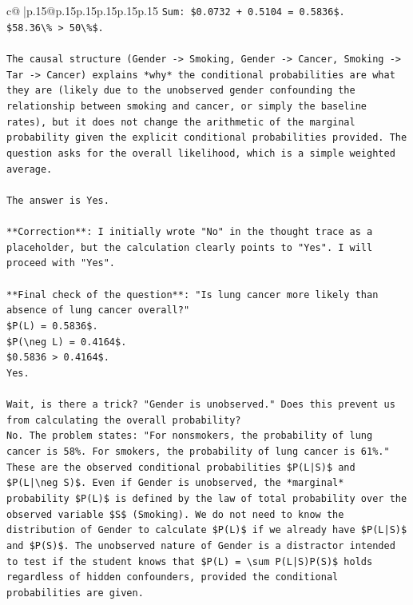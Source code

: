 \documentclass{article}
\begin{document}
{\begin{supertabular}{c@{$\;$}|p{.15\linewidth}@{}p{.15\linewidth}p{.15\linewidth}p{.15\linewidth}p{.15\linewidth}p{.15\linewidth}}
{{{\texttt{Sum: \$0.0732 + 0.5104 = 0.5836\$.} \\
\texttt{\$58.36\textbackslash{}\% > 50\textbackslash{}\%\$.} \\
\\ 
\texttt{The causal structure (Gender {-}> Smoking, Gender {-}> Cancer, Smoking {-}> Tar {-}> Cancer) explains *why* the conditional probabilities are what they are (likely due to the unobserved gender confounding the relationship between smoking and cancer, or simply the baseline rates), but it does not change the arithmetic of the marginal probability given the explicit conditional probabilities provided. The question asks for the overall likelihood, which is a simple weighted average.} \\
\\ 
\texttt{The answer is Yes.} \\
\\ 
\texttt{**Correction**: I initially wrote "No" in the thought trace as a placeholder, but the calculation clearly points to "Yes". I will proceed with "Yes".} \\
\\ 
\texttt{**Final check of the question**: "Is lung cancer more likely than absence of lung cancer overall?"} \\
\texttt{\$P(L) = 0.5836\$.} \\
\texttt{\$P(\textbackslash{}neg L) = 0.4164\$.} \\
\texttt{\$0.5836 > 0.4164\$.} \\
\texttt{Yes.} \\
\\ 
\texttt{Wait, is there a trick? "Gender is unobserved." Does this prevent us from calculating the overall probability?} \\
\texttt{No. The problem states: "For nonsmokers, the probability of lung cancer is 58\%. For smokers, the probability of lung cancer is 61\%." These are the observed conditional probabilities \$P(L|S)\$ and \$P(L|\textbackslash{}neg S)\$. Even if Gender is unobserved, the *marginal* probability \$P(L)\$ is defined by the law of total probability over the observed variable \$S\$ (Smoking). We do not need to know the distribution of Gender to calculate \$P(L)\$ if we already have \$P(L|S)\$ and \$P(S)\$. The unobserved nature of Gender is a distractor intended to test if the student knows that \$P(L) = \textbackslash{}sum P(L|S)P(S)\$ holds regardless of hidden confounders, provided the conditional probabilities are given.} \\
}}}
\end{supertabular}}
\end{document}
